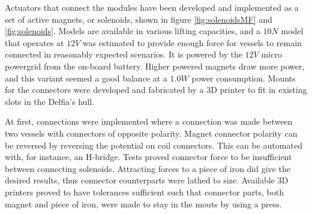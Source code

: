 Actuators that connect the modules have been developed and implemented as a set of active magnets, or solenoids, shown in figure \ref{fig:solenoidsMF} and \ref{fig:solenoids}. Models are available in various lifting capacities, and a $10N$ model that operates at $12V$ was estimated to provide enough force for vessels to remain connected in reasonably expected scenarios. It is powered by the $12V$ micro powergrid from the on-board battery.  Higher powered magnets draw more power, and this variant seemed a good balance at a $1.0W$ power consumption. Mounts for the connectors were developed and fabricated by a 3D printer to fit in existing slots in the Delfia's hull.

At first, connections were implemented where a connection was made between two vessels with connectors of opposite polarity. Magnet connector polarity can be reversed by reversing the potential on coil connectors. This can be automated with, for instance, an H-bridge. Tests proved connector force to be insufficient between connecting solenoids. Attracting forces to a piece of iron did give the desired results, thus connector counterparts were lathed to size. Available 3D printers proved to have tolerances sufficient such that connector parts, both magnet and piece of iron, were made to stay in the mouts by using a press. 


 \begin{figure}[H]
	\centering
\end{figure}

